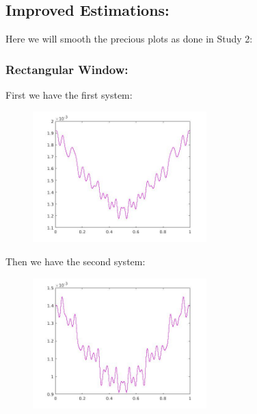 \documentclass[a4paper,11pt]{article}
\begin{document}
\subsection{Improved Estimations:}

Here we will smooth the precious plots as done in Study 2:

\subsubsection{Rectangular Window:}

First we have the first system:

\begin{figure}[!hp]
    \begin{center}
    \includegraphics[width=0.6\textwidth]{images/lab4_23.jpg}
    \end{center}
\end{figure}

Then we have the second system:

\begin{figure}[!hp]
    \begin{center}
    \includegraphics[width=0.6\textwidth]{images/lab4_33.jpg}
    \end{center}
\end{figure}
\end{document}
